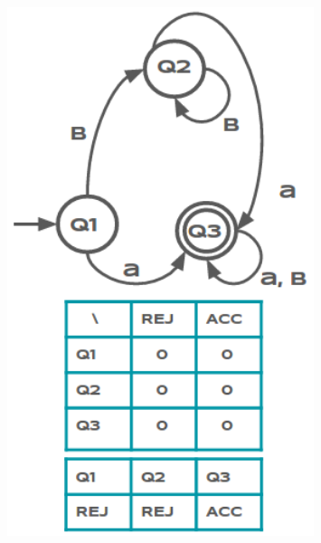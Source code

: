 \documentclass{mini}
\begin{document}
\begin{figure}[H]
\RawFloats
\centering
\begin{minipage}{.3\textwidth}
\centering
  \includegraphics[width=0.8\textwidth]{./images/hc_example_1.png}
\caption{}
\label{fig:smart_state_example_1}
\end{minipage}\hfill
\begin{minipage}{.3\textwidth}
\centering

\end{minipage}
\end{figure}
\end{document}
